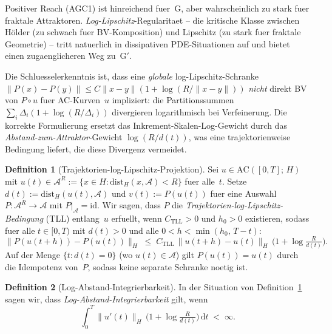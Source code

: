 \documentclass[12pt,a4paper]{article}
\theoremstyle{definition}
\newtheorem{definition}{Definition}[section]
\theoremstyle{plain}
\theoremstyle{remark}
\begin{document}
Positiver Reach (AGC1) ist hinreichend fuer~G, aber wahrscheinlich zu stark fuer
fraktale Attraktoren. \emph{Log-Lipschitz}-Regularitaet -- die kritische
Klasse zwischen H\"older (zu schwach fuer BV-Komposition) und Lipschitz
(zu stark fuer fraktale Geometrie) -- tritt natuerlich in dissipativen
PDE-Situationen auf und bietet einen zugaenglicheren Weg zu~G$'$.

Die Schluesselerkenntnis ist, dass eine \emph{globale} log-Lipschitz-Schranke
$\|P(x)-P(y)\| \le C\|x-y\|(1+\log(R/\|x-y\|))$
\emph{nicht} direkt BV von $P\circ u$ fuer AC-Kurven~$u$ impliziert:
die Partitionssummen $\sum_i \Delta_i(1+\log(R/\Delta_i))$ divergieren
logarithmisch bei Verfeinerung. Die korrekte Formulierung ersetzt das
Inkrement-Skalen-Log-Gewicht durch das
\emph{Abstand-zum-Attraktor}-Gewicht $\log(R/d(t))$, was eine
trajektorienweise Bedingung liefert, die diese Divergenz vermeidet.

\begin{definition}[Trajektorien-log-Lipschitz-Projektion]
\label{def:TLL}
Sei $u \in \mathrm{AC}([0,T];\,H)$ mit $u(t) \in \mathcal{A}^R
:= \{x \in H : \mathrm{dist}_H(x,\mathcal{A}) < R\}$ fuer alle~$t$.
Setze $d(t) := \mathrm{dist}_H(u(t),\mathcal{A})$ und
$v(t) := P(u(t))$ fuer eine Auswahl
$P: \mathcal{A}^R \to \mathcal{A}$ mit $P|_{\mathcal{A}} = \mathrm{id}$.
Wir sagen, dass $P$ die \emph{Trajektorien-log-Lipschitz-Bedingung} (TLL) entlang~$u$ erfuellt, wenn $C_{\mathrm{TLL}} > 0$ und
$h_0 > 0$ existieren, sodass fuer alle $t \in [0,T)$ mit $d(t) > 0$ und
alle $0 < h < \min(h_0,\, T-t)$:
\begin{equation}\label{eq:TLL}
  \|P(u(t\!+\!h)) - P(u(t))\|_H
  \;\le\;
  C_{\mathrm{TLL}}\,\|u(t\!+\!h) - u(t)\|_H\,
  \bigl(1 + \log\tfrac{R}{d(t)}\bigr).
  \tag{TLL}
\end{equation}
Auf der Menge $\{t : d(t)=0\}$ (wo $u(t) \in \mathcal{A}$) gilt
$P(u(t)) = u(t)$ durch die Idempotenz von~$P$, sodass keine separate Schranke
noetig ist.
\end{definition}

\begin{definition}[Log-Abstand-Integrierbarkeit]
\label{def:LDI}
In der Situation von Definition~\ref{def:TLL} sagen wir, dass
\emph{Log-Abstand-Integrierbarkeit} gilt, wenn
\begin{equation}\label{eq:LDI}
  \int_0^T \|u'(t)\|_H\,
  \bigl(1 + \log\tfrac{R}{d(t)}\bigr)\,\mathrm{d}t
  \;<\; \infty.
  \tag{LDI}
\end{equation}
\end{definition}
\end{document}
